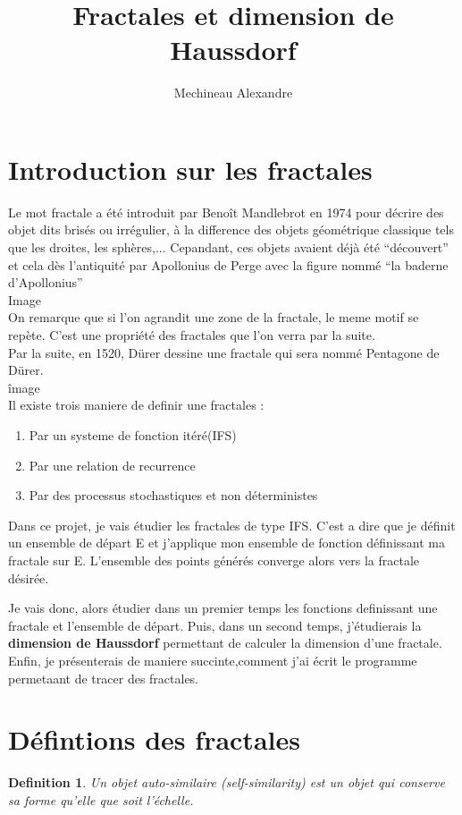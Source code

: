 \documentclass[a4paper, 12pt]{report}
\title{ \bf Fractales et dimension de Haussdorf}
\author{Mechineau Alexandre}
\begin{document}
\maketitle
\newtheorem{definition}{Definition}
\tableofcontents


\part{\bf Introduction sur les fractales}
Le mot fractale a été introduit par Benoît Mandlebrot en 1974 pour décrire des objet dits brisés ou irrégulier, à la difference des objets géométrique classique tels que les droites, les sphères,...
Cepandant, ces objets avaient déjà été ``découvert'' et cela dès l'antiquité par Apollonius de Perge avec la figure nommé ``la baderne d'Apollonius''\\
Image\\
On remarque que si l'on agrandit une zone de la fractale, le meme motif se repète. C'est une propriété des fractales que l'on verra par la suite.\\
Par la suite, en 1520, Dürer dessine une fractale qui sera nommé Pentagone de Dürer.\\
îmage\\

Il existe trois maniere de definir une fractales :
\begin{enumerate}\itemsep2pt
	\item Par un systeme de fonction itéré(IFS)
	\item Par  une relation de recurrence
	\item Par des processus stochastiques et non déterministes
\end{enumerate}

Dans ce projet, je vais étudier les fractales de type IFS. C'est a dire que  je définit un ensemble de départ E et j'applique mon ensemble de fonction définissant ma fractale sur E.
L'ensemble des points générés converge alors vers la fractale désirée.

Je vais donc, alors étudier dans un premier temps les fonctions definissant une fractale et l'ensemble de départ.
Puis, dans un second temps, j'étudierais la {\bf dimension de Haussdorf} permettant de calculer la dimension d'une fractale.
Enfin, je présenterais de maniere succinte,comment j'ai écrit le programme permetaant de tracer des fractales.

\part{\bf Défintions des fractales}
\begin{definition}
	Un objet auto-similaire (self-similarity) est un objet qui conserve sa forme qu'elle que soit l'échelle. 
\end{definition}
\end{document}
